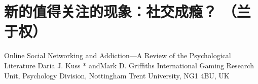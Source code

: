 \section{新的值得关注的现象：社交成瘾？  %
（兰于权）%
}

Online Social Networking and Addiction—A Review of the Psychological Literature
Daria J. Kuss *   andMark D. Griffiths 
International Gaming Research Unit, Psychology Division, Nottingham Trent University, NG1 4BU, UK

